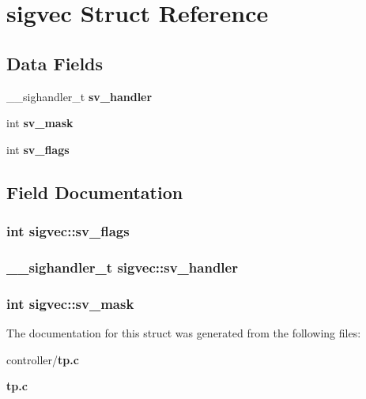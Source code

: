 \section{sigvec Struct Reference}
\label{structsigvec}
\subsection*{Data Fields}
\begin{DoxyCompactItemize}
\item 
\_\-\_\-sighandler\_\-t {\bf sv\_\-handler}
\item 
int {\bf sv\_\-mask}
\item 
int {\bf sv\_\-flags}
\end{DoxyCompactItemize}


\subsection{Field Documentation}
\subsubsection[{sv\_\-flags}]{\setlength{\rightskip}{0pt plus 5cm}int {\bf sigvec::sv\_\-flags}}\label{structsigvec_a8db62fb99937db45ef5d8d3c0cff93e2}
\subsubsection[{sv\_\-handler}]{\setlength{\rightskip}{0pt plus 5cm}\_\-\_\-sighandler\_\-t {\bf sigvec::sv\_\-handler}}\label{structsigvec_aa59ce1c683b7e3ef33326e4db61a6f2e}
\subsubsection[{sv\_\-mask}]{\setlength{\rightskip}{0pt plus 5cm}int {\bf sigvec::sv\_\-mask}}\label{structsigvec_a12ee8a3a46d8209367a5c0bbae2a5c87}


The documentation for this struct was generated from the following files:\begin{DoxyCompactItemize}
\item 
controller/{\bf tp.c}\item 
{\bf tp.c}\end{DoxyCompactItemize}
